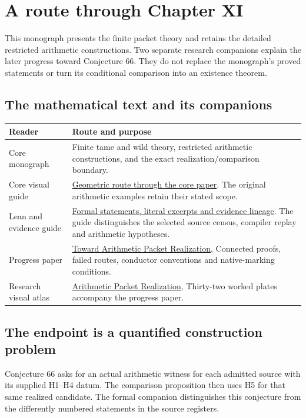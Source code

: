 \begingroup\raggedright
\section*{A route through Chapter XI}
{}
This monograph presents the finite packet theory and retains the detailed restricted arithmetic constructions. Two separate research companions explain the later progress toward Conjecture 66. They do not replace the monograph's proved statements or turn its conditional comparison into an existence theorem.

\subsection*{The mathematical text and its companions}
\begin{tabular}{@{}>{\raggedright\arraybackslash}p{.28\linewidth}>{\raggedright\arraybackslash}p{.67\linewidth}@{}}\toprule
Reader & Route and purpose\\\midrule
Core monograph & Finite tame and wild theory, restricted arithmetic constructions, and the exact realization/comparison boundary.\\[7pt]
Core visual guide & \href{https://komorebi.invalid/b07/core_visual}{Geometric route through the core paper}. The original arithmetic examples retain their stated scope.\\[7pt]
Lean and evidence guide & \href{https://komorebi.invalid/b07/core_lean}{Formal statements, literal excerpts and evidence lineage}. The guide distinguishes the selected source census, compiler replay and arithmetic hypotheses.\\[7pt]
Progress paper & \href{https://komorebi.invalid/b07/research_start}{Toward Arithmetic Packet Realization}, Connected proofs, failed routes, conductor conventions and native-marking conditions.\\[7pt]
Research visual atlas & \href{https://komorebi.invalid/b07/atlas_start}{Arithmetic Packet Realization}, Thirty-two worked plates accompany the progress paper.\\\bottomrule
\end{tabular}

\subsection*{The endpoint is a quantified construction problem}
Conjecture 66 asks for an actual arithmetic witness for each admitted source with its supplied H1--H4 datum. The comparison proposition then uses H5 for that same realized candidate. The formal companion distinguishes this conjecture from the differently numbered statements in the source registers.

